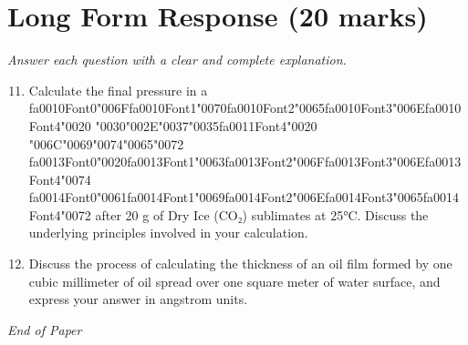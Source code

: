 \documentclass[12pt]{article}
\begin{document}
\section*{Long Form Response (20 marks)}
\textit{Answer each question with a clear and complete explanation.}
\begin{enumerate}[label=\arabic*.]
\setcounter{enumi}{10}
\item Calculate the final pressure in a {\csname fa0010Font0\endcsname\char"006F}{\csname fa0010Font1\endcsname\char"0070}{\csname fa0010Font2\endcsname\char"0065}{\csname fa0010Font3\endcsname\char"006E}{\csname fa0010Font4\endcsname\char"0020} {\char"0030}{\char"002E}{\char"0037}{\char"0035}{\csname fa0011Font4\endcsname\char"0020} {\char"006C}{\char"0069}{\char"0074}{\char"0065}{\char"0072} {\csname fa0013Font0\endcsname\char"0020}{\csname fa0013Font1\endcsname\char"0063}{\csname fa0013Font2\endcsname\char"006F}{\csname fa0013Font3\endcsname\char"006E}{\csname fa0013Font4\endcsname\char"0074} {\csname fa0014Font0\endcsname\char"0061}{\csname fa0014Font1\endcsname\char"0069}{\csname fa0014Font2\endcsname\char"006E}{\csname fa0014Font3\endcsname\char"0065}{\csname fa0014Font4\endcsname\char"0072} after 20 g of Dry Ice
(CO₂) sublimates at 25°C. Discuss the underlying principles involved in your calculation.
\item Discuss the process of calculating the thickness of an oil film formed by one cubic
millimeter of oil spread over one square meter of water surface, and express your answer
in angstrom units.
\end{enumerate}

\vfill
\noindent\textit{End of Paper}
\end{document}
